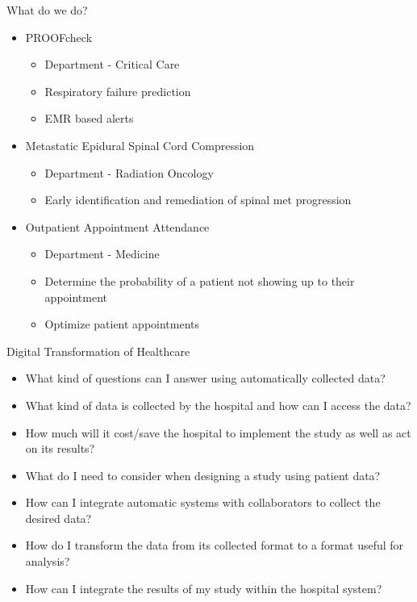 \documentclass[10pt, xcolor=table]{beamer}
\begin{document}
\begin{frame}{What do we do?}
	\begin{itemize}
		\item PROOFcheck
			\begin{itemize}
					\item Department - Critical Care
					\item Respiratory failure prediction
					\item EMR based alerts
			\end{itemize}
		\item Metastatic Epidural Spinal Cord Compression
			\begin{itemize}
				\item Department - Radiation Oncology
				\item Early identification and remediation of spinal met progression
			\end{itemize}
		\item Outpatient Appointment Attendance 
			\begin{itemize}
				\item Department - Medicine
				\item Determine the probability of a patient not showing up to their appointment
				\item Optimize patient appointments
			\end{itemize}
	\end{itemize}
	
\end{frame}

\begin{frame}{Digital Transformation of Healthcare}
	\small
	\begin{itemize}
		\item What kind of questions can I answer using automatically collected data?
		\item What kind of data is collected by the hospital and how can I access the data?
		\item How much will it cost/save the hospital to implement the study as well as act on its results?
		\item What do I need to consider when designing a study using patient data? 
		\item How can I integrate automatic systems with collaborators to collect the desired data?
		\item How do I transform the data from its collected format to a format useful for analysis?
		\item How can I integrate the results of my study within the hospital system?
	\end{itemize}
\end{frame}
\end{document}
